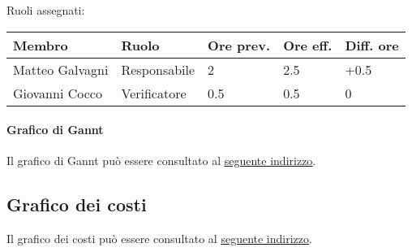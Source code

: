 \documentclass[a4paper, 12pt]{article}
\begin{document}
Ruoli assegnati:\\[0.5em]
\begin{tabular}{|l|l|l|l|l|}\hline
Membro & Ruolo & Ore prev. & Ore eff. & Diff. ore \\\hline
Matteo Galvagni & Responsabile & 2 & 2.5 & +0.5 \\\hline
Giovanni Cocco & Verificatore & 0.5 & 0.5 & 0 \\\hline
\end{tabular}

\paragraph{Grafico di Gannt}
Il grafico di Gannt può essere consultato al \underline{\href{https://docs.google.com/spreadsheets/d/e/2PACX-1vRd4970Fob6KlNwY1iV6bnHZXNl41F74utFkkc9ykuT1NUEGLnFcCd4rOHbXjW99ichDnkV3cEGCmWi/pubhtml?gid=1972921762}{seguente indirizzo}}.


\subsection{Grafico dei costi}
Il grafico dei costi può essere consultato al \underline{\href{https://docs.google.com/spreadsheets/d/e/2PACX-1vRd4970Fob6KlNwY1iV6bnHZXNl41F74utFkkc9ykuT1NUEGLnFcCd4rOHbXjW99ichDnkV3cEGCmWi/pubhtml?gid=263680959}{seguente indirizzo}}.
\end{document}
